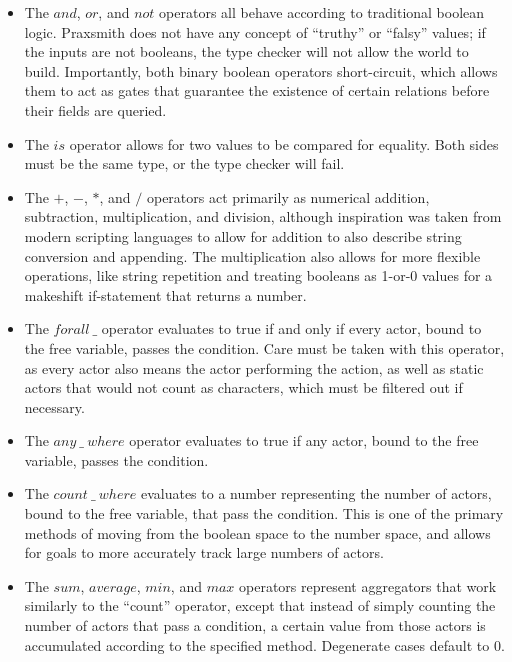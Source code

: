 \begin{itemize}
    \item The $and$, $or$, and $not$ operators all behave according to traditional boolean
    logic. Praxsmith does not have any concept of ``truthy'' or ``falsy'' values; if the inputs
    are not booleans, the type checker will not allow the world to build. Importantly, both
    binary boolean operators short-circuit, which allows them to act as gates that guarantee
    the existence of certain relations before their fields are queried.
    \item The $is$ operator allows for two values to be compared for equality. Both sides
    must be the same type, or the type checker will fail.
    \item The $+$, $-$, $*$, and $/$ operators act primarily as numerical addition,
    subtraction, multiplication, and division, although inspiration was taken from
    modern scripting languages to allow for addition to also describe string conversion
    and appending. The multiplication also allows for more flexible operations, like
    string repetition and treating booleans as 1-or-0 values for a makeshift if-statement
    that returns a number.
    \item The $for all\ \_$ operator evaluates to true if and only if every actor, bound
    to the free variable, passes the condition. Care must be taken with this operator, as
    every actor also means the actor performing the action, as well as static actors that
    would not count as characters, which must be filtered out if necessary.
    \item The $any\ \_\ where$ operator evaluates to true if any actor, bound to the free
    variable, passes the condition.
    \item The $count\ \_\ where$ evaluates to a number representing the number of actors,
    bound to the free variable, that pass the condition. This is one of the primary
    methods of moving from the boolean space to the number space, and allows for
    goals to more accurately track large numbers of actors.
    \item The $sum$, $average$, $min$, and $max$ operators represent aggregators that
    work similarly to the ``count'' operator, except that instead of simply counting the number
    of actors that pass a condition, a certain value from those actors is accumulated
    according to the specified method. Degenerate cases default to $0$.
\end{itemize}

